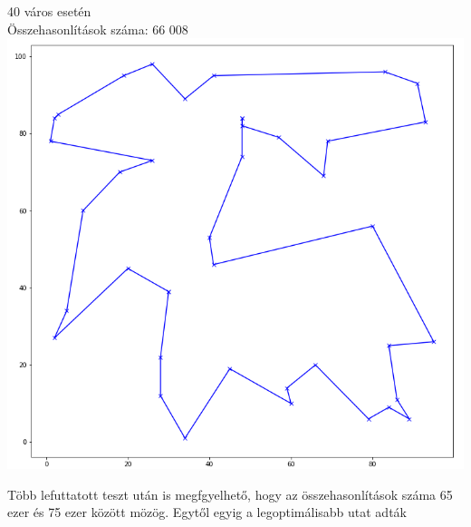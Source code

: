 \documentclass[12pt,a4paper]{article}
\begin{document}
\begin{flushleft}
40 város esetén \\
Összehasonlítások száma: 66 008
\includegraphics[scale=0.4]{40.png}
\end{flushleft}

Több lefuttatott teszt után is megfgyelhető, hogy az összehasonlítások száma 65 ezer és 75 ezer között mözög. Egytől egyig a legoptimálisabb utat adták
\end{document}
